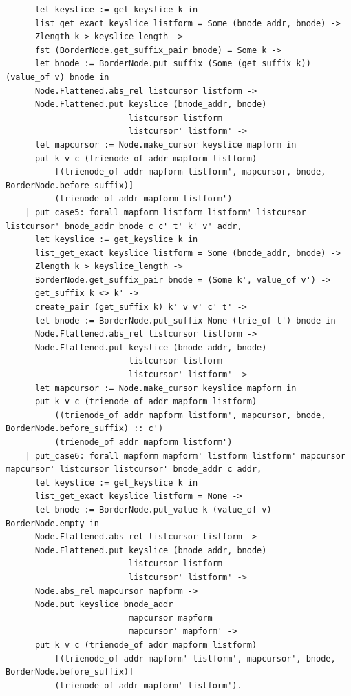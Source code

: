\documentclass[runningheads]{llncs}
\begin{document}
\begin{verbatim}
      let keyslice := get_keyslice k in
      list_get_exact keyslice listform = Some (bnode_addr, bnode) ->
      Zlength k > keyslice_length ->
      fst (BorderNode.get_suffix_pair bnode) = Some k ->
      let bnode := BorderNode.put_suffix (Some (get_suffix k)) (value_of v) bnode in
      Node.Flattened.abs_rel listcursor listform ->
      Node.Flattened.put keyslice (bnode_addr, bnode)
                         listcursor listform
                         listcursor' listform' ->
      let mapcursor := Node.make_cursor keyslice mapform in
      put k v c (trienode_of addr mapform listform)
          [(trienode_of addr mapform listform', mapcursor, bnode, BorderNode.before_suffix)]
          (trienode_of addr mapform listform')
    | put_case5: forall mapform listform listform' listcursor listcursor' bnode_addr bnode c c' t' k' v' addr,
      let keyslice := get_keyslice k in
      list_get_exact keyslice listform = Some (bnode_addr, bnode) ->
      Zlength k > keyslice_length ->
      BorderNode.get_suffix_pair bnode = (Some k', value_of v') ->
      get_suffix k <> k' ->
      create_pair (get_suffix k) k' v v' c' t' ->
      let bnode := BorderNode.put_suffix None (trie_of t') bnode in
      Node.Flattened.abs_rel listcursor listform ->
      Node.Flattened.put keyslice (bnode_addr, bnode)
                         listcursor listform
                         listcursor' listform' ->
      let mapcursor := Node.make_cursor keyslice mapform in
      put k v c (trienode_of addr mapform listform)
          ((trienode_of addr mapform listform', mapcursor, bnode, BorderNode.before_suffix) :: c')
          (trienode_of addr mapform listform')
    | put_case6: forall mapform mapform' listform listform' mapcursor mapcursor' listcursor listcursor' bnode_addr c addr,
      let keyslice := get_keyslice k in
      list_get_exact keyslice listform = None ->
      let bnode := BorderNode.put_value k (value_of v) BorderNode.empty in
      Node.Flattened.abs_rel listcursor listform ->
      Node.Flattened.put keyslice (bnode_addr, bnode)
                         listcursor listform
                         listcursor' listform' ->
      Node.abs_rel mapcursor mapform ->
      Node.put keyslice bnode_addr
                         mapcursor mapform
                         mapcursor' mapform' ->
      put k v c (trienode_of addr mapform listform)
          [(trienode_of addr mapform' listform', mapcursor', bnode, BorderNode.before_suffix)]
          (trienode_of addr mapform' listform').


\end{verbatim}
\end{document}
